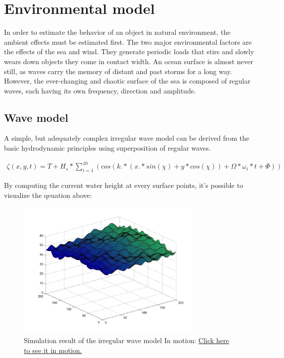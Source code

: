 \section{Environmental model}

In order to estimate the behavior of an object in natural environment, the ambient effects must be estimated first. The two major environmental factors are the effects of the sea and wind. They generate periodic loads that stirs and slowly wears down objects they come in contact width. An ocean surface is almost never still, as waves carry the memory of distant and past storms for a long way. However, the ever-changing and chaotic surface of the sea is composed of regular waves, each having its own frequency, direction and amplitude.

\subsection{Wave model} A simple, but adequately complex irregular wave model\cite[p.~14]{shipsim} can be derived from the basic hydrodynamic principles using superposition of regular waves\cite[p.~19]{hydromechanics}.

\begin{align}
		\zeta (x, y, t) = T + H_s * \sum_{i=1}^{10} (cos(k .* (x .* sin(\chi) + y * cos(\chi)) + \Omega * \omega{_i} * t + \Phi))
\end{align}

By computing the current water height at every surface points, it's possible to visualize the qeuation above:

\begin{figure}[H]
	\centering
	\includegraphics[width=0.8\textwidth]{fig/wavemodel}
	\caption{Simulation result of the irregular wave model \n In motion: \href{youtube.com}{Click here to see it in motion.}}
	\label{fig:wavemodel}
\end{figure}

